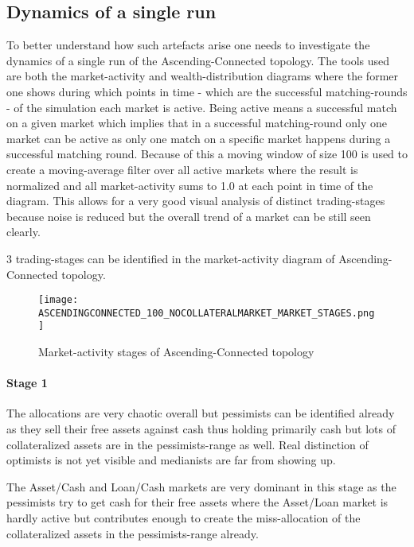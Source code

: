 \documentclass[Bachelorarbeit.tex]{subfiles}
\begin{document}
\subsection{Dynamics of a single run}
\label{sub:dynamics_singlerun}
To better understand how such artefacts arise one needs to investigate the dynamics of a single run of the Ascending-Connected topology. The tools used  
are both the market-activity and wealth-distribution diagrams where the former one shows during which points in time - which are the successful matching-rounds - of the simulation each market is active. Being active means a successful match on a given market which implies that in a successful matching-round only one market can be active as only one match on a specific market happens during a successful matching round. Because of this a moving window of size 100 is used to create a moving-average filter over all active markets where the result is normalized and all market-activity sums to 1.0 at each point in time of the diagram. This allows for a very good visual analysis of distinct trading-stages because noise is reduced but the overall trend of a market can be still seen clearly.

\medskip

3 trading-stages can be identified in the market-activity diagram of Ascending-Connected topology.

\begin{figure}[H]
	\centering
  \texttt{[image: ASCENDINGCONNECTED\_100\_NOCOLLATERALMARKET\_MARKET\_STAGES.png]}
  	\caption{Market-activity stages of Ascending-Connected topology}
	\label{fig:markets_ASCENDINGCONNECTED_100_NOCOLLATERALMARKET_MARKET_STAGES}
\end{figure}

\paragraph{Stage 1}
The allocations are very chaotic overall but pessimists can be identified already as they sell their free assets against cash thus holding primarily cash but lots of collateralized assets are in the pessimists-range as well. Real distinction of optimists is not yet visible and medianists are far from showing up.

\medskip

The Asset/Cash and Loan/Cash markets are very dominant in this stage as the pessimists try to get cash for their free assets where the Asset/Loan market is hardly active but contributes enough to create the miss-allocation of the collateralized assets in the pessimists-range already.
\end{document}
